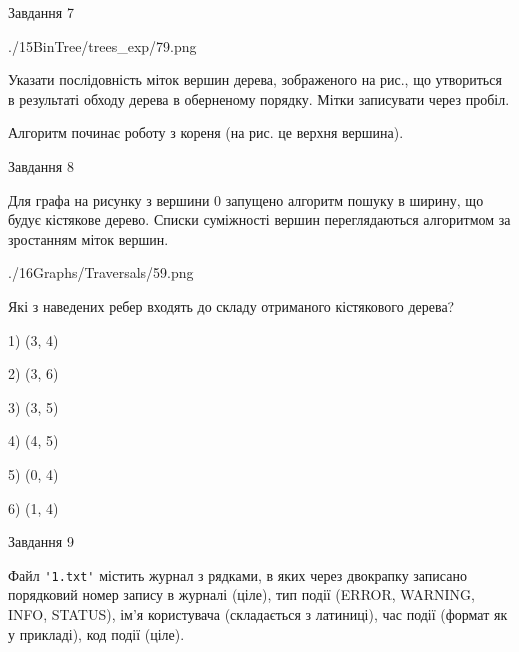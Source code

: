 \documentclass[12pt, ukrainian]{article}
\def\code#1{\Verb!#1!}
\begin{document}
{\vspace{10mm}\par

\newpage
\begin{minipage}[t]{9.7cm}
               
{\begin{center}Завдання {7}\end{center}}
\vspace{-6mm}

\begin{center}
	{./15BinTree/trees_exp/79.png}
\end{center}
Указати послідовність міток вершин дерева, зображеного на рис., що утвориться в результаті обходу дерева в оберненому порядку. Мітки записувати через пробіл.\par Алгоритм починає роботу з кореня (на рис. це верхня вершина).\par

\end{minipage}
\vline \hspace{8mm}
\begin{minipage}[t]{8.0cm}
               
{\begin{center}Завдання {8}\end{center}}
\vspace{-6mm}
Для графа на рисунку з вершини 0 запущено алгоритм пошуку в ширину, що будує кістякове дерево. Списки суміжності вершин переглядаються алгоритмом за зростанням міток вершин.\par
\begin{center}
	{./16Graphs/Traversals/59.png}
\end{center}
\par Які з наведених ребер входять до складу отриманого кістякового дерева?\par
1) (3, 4)\par
2) (3, 6)\par
3) (3, 5)\par
4) (4, 5)\par
5) (0, 4)\par
6) (1, 4)\par
{\vskip 15pt} \par

\end{minipage}

               
{\begin{center}Завдання {9}\end{center}}
\vspace{-6mm}
Файл \code{'1.txt'} містить журнал з рядками, в яких через двокрапку записано поряд\-ко\-вий номер запису в журналі (ціле), тип події (ERROR, WARNING, INFO, STATUS), ім'я користувача (складається з латиниці), час події (фор\-мат як у прикладі), код події (ціле).

}
\end{document}
